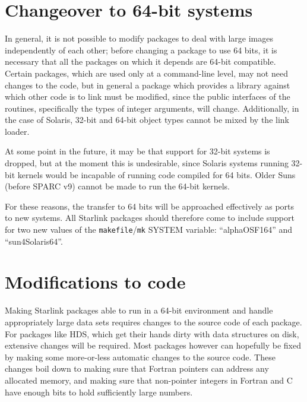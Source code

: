 \documentclass[twoside,11pt]{article}
\newcommand{\xref}[3]{#1}
\renewcommand{\_}{\texttt{\symbol{95}}}
\newcommand{\file}[1]{{\tt #1}}
\begin{document}
\section{Changeover to 64-bit systems\label{sec:changeover}}

In general, it is not possible to modify packages to deal with large
images independently of each other;
before changing a package to use 64 bits, it is necessary 
that all the packages on which it depends are 64-bit compatible.
Certain packages, which are used only at a command-line level, 
may not need changes to the code, but in general 
a package which provides a library 
against which other code is to link must be modified,
since the public interfaces of the routines,
specifically the types of integer arguments, will change. 
Additionally, in the case of Solaris,
32-bit and 64-bit object types cannot be mixed by the link loader.

At some point in the future, it may be that support for 32-bit systems
is dropped, but at the moment this is undesirable, since 
Solaris systems running 32-bit kernels would be incapable of running
code compiled for 64 bits.  
Older Suns (before SPARC v9) cannot be made to run the 64-bit kernels.

For these reasons, the transfer to 64 bits will be approached
effectively as ports to new systems.  All Starlink packages should
therefore come to 
include support for two new values of the \file{makefile}/\file{mk}
SYSTEM variable: ``alpha\_OSF1\_64'' and ``sun4\_Solaris\_64''.



\section{Modifications to code\label{sec:modificienda}}

Making Starlink packages able to run in a 64-bit environment and 
handle appropriately large data sets requires changes to the source
code of each package.
For packages like \xref{HDS}{sun92}{}, 
which get their hands dirty with data structures on disk,
extensive changes will be required.
Most packages however can hopefully be fixed by making some more-or-less
automatic changes to the source code.
These changes boil down to making sure that Fortran pointers 
can address any allocated memory,
and making sure that non-pointer integers in Fortran and C 
have enough bits to hold sufficiently large numbers.
\end{document}
